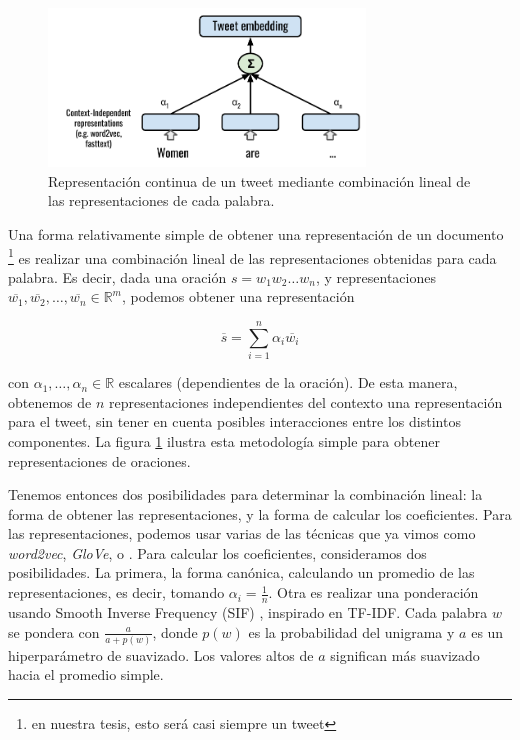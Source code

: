 
\begin{figure}[t]
    \centering
    \includegraphics[width=0.75\textwidth]{img/tweet_embeddings.pdf}
    \caption{Representación continua de un tweet mediante combinación lineal de las representaciones de cada palabra.}
    \label{fig:tweet_embeddings}
\end{figure}

Una forma relativamente simple de obtener una representación de un documento \footnote{en nuestra tesis, esto será casi siempre un tweet} es realizar una combinación lineal de las representaciones obtenidas para cada palabra. Es decir, dada una oración $s = w_1 w_2 \ldots w_n$, y representaciones $\overline{w_1}, \overline{w_2}, \ldots, \overline{w_n} \in \mathbb{R}^m$, podemos obtener una representación

\begin{equation}
    \overline{s} = \sum\limits_{i=1}^{n} \alpha_i \overline{w_i}
\end{equation}

con $\alpha_1, \ldots, \alpha_n \in \mathbb{R}$ escalares (dependientes de la oración). De esta manera, obtenemos de $n$ representaciones independientes del contexto una representación para el tweet, sin tener en cuenta posibles interacciones entre los distintos componentes. La figura \ref{fig:tweet_embeddings} ilustra esta metodología simple para obtener representaciones de oraciones.

Tenemos entonces dos posibilidades para determinar la combinación lineal: la forma de obtener las representaciones, y la forma de calcular los coeficientes. Para las representaciones, podemos usar varias de las técnicas que ya vimos como \emph{word2vec}, \emph{GloVe}, o \fasttext{}. Para calcular los coeficientes, consideramos dos posibilidades. La primera, la forma canónica, calculando un promedio de las representaciones, es decir, tomando $\alpha_i = \frac{1}{n}$. Otra es realizar una ponderación usando Smooth Inverse Frequency (SIF) \cite{arora17}, inspirado en TF-IDF. Cada palabra $ w $ se pondera con $ \frac {a} {a + p (w)} $, donde $ p (w) $ es la probabilidad del unigrama  y $a$ es un hiperparámetro de suavizado. Los valores altos de $ a $ significan más suavizado hacia el promedio simple.



